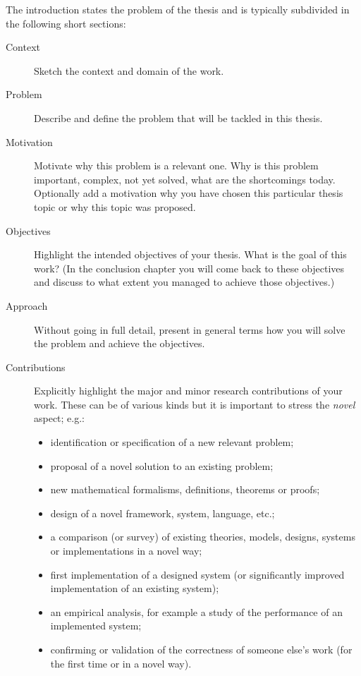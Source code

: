 \documentclass[british]{article}
\begin{document}
The introduction states the problem of the thesis and is typically subdivided in the following short sections:
\begin{description}

\item[Context] Sketch the context and domain of the work.

\item[Problem] Describe and define the problem that will be tackled in
  this thesis.

\item[Motivation] Motivate why this problem is a relevant one. Why is
  this problem important, complex, not yet solved, what are the
  shortcomings today. Optionally add a motivation why you have chosen
  this particular thesis topic or why this topic was proposed.

\item[Objectives] Highlight the intended objectives of your
  thesis. What is the goal of this work? (In the conclusion chapter
  you will come back to these objectives and discuss to what extent
  you managed to achieve those objectives.)

\item[Approach] Without going in full detail, present in general terms
  how you will solve the problem and achieve the objectives.

\item[Contributions] Explicitly highlight the major and minor research
  contributions of your work. These can be of various kinds but it is
  important to stress the \emph{novel} aspect; e.g.:
  \begin{itemize}
  \item identification or specification of a new relevant problem;
  \item proposal of a novel solution to an existing problem;
  \item new mathematical formalisms, definitions, theorems or proofs;
  \item design of a novel framework, system, language, etc.;
  \item a comparison (or survey) of existing theories, models,
    designs, systems or implementations in a novel way;
  \item first implementation of a designed system (or significantly
    improved implementation of an existing system);
  \item an empirical analysis, for example a study of the performance
    of an implemented system;
  \item confirming or validation of the correctness of someone else’s
    work (for the first time or in a novel way).
  \end{itemize}


\end{description}
\end{document}
